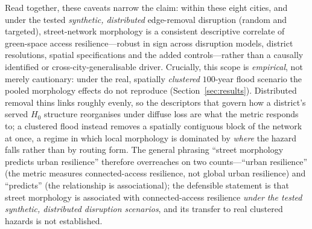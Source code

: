 \documentclass[sn-mathphys-num,pdflatex]{sn-jnl}
\begin{document}
Read together, these caveats narrow the claim: within these eight cities, and under
the tested \emph{synthetic, distributed} edge-removal disruption (random and targeted),
street-network morphology is a consistent descriptive correlate of green-space access
resilience---robust in sign across disruption models, district resolutions, spatial
specifications and the added controls---rather than a causally identified or
cross-city-generalisable driver. Crucially, this scope is \emph{empirical}, not merely
cautionary: under the real, spatially \emph{clustered} $100$-year flood scenario the
pooled morphology effects do not reproduce (Section~\ref{sec:results}). Distributed
removal thins links roughly evenly, so the descriptors that govern how a district's
served $H_0$ structure reorganises under diffuse loss are what the metric
responds to; a clustered flood instead removes a spatially contiguous block of the
network at once, a regime in which local morphology is dominated by \emph{where} the
hazard falls rather than by routing form. The general phrasing ``street morphology
predicts urban resilience'' therefore overreaches on two counts---``urban resilience''
(the metric measures connected-access resilience, not global urban resilience) and
``predicts'' (the relationship is associational); the defensible statement is that
street morphology is associated with connected-access resilience \emph{under the
tested synthetic, distributed disruption scenarios}, and its transfer to real
clustered hazards is not established.
\end{document}
